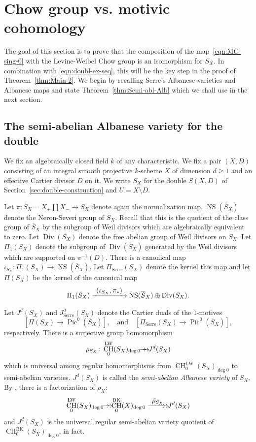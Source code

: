 \documentclass[JEP,XML,SOM,Unicode,published]{cedram}
\newcommand{\onto}{\mathchoice{\to\hspace*{-5mm}\to}{\hspace*{-.5mm}\to\hspace*{-2.85mm}\to\hspace*{-.5mm}}{\to\hspace*{-3mm}\to}{\to\hspace*{-3mm}\to}}
\def\To#1{\mathchoice{\xrightarrow{\textstyle\kern4pt#1\kern3pt}}{\stackrel{#1}{\longrightarrow}}{}{}}
\def\Onto#1{\mathchoice{\To{#1}\hspace*{-5mm}\to}{\stackrel{#1}{\onto}}{}{}}
\let\surj\onto
\newcommand{\BK}{\mathrm{BK}}
\newcommand{\LW}{\mathrm{LW}}
\newcommand{\Serre}{\mathrm{Serre}}
\theoremstyle{definition}
\newcommand{\thmref}{Theorem~\ref}
\newcommand{\secref}{Section~\ref}
\DeclareMathOperator{\CH}{CH}
\DeclareMathOperator{\Div}{Div}
\DeclareMathOperator{\NS}{NS}
\DeclareMathOperator{\Pic}{Pic}
\let\ov\overline
\let\wt\widetilde
\begin{document}
\section{Chow group vs. motivic cohomology}
\label{sec:Alb-double}
The goal of this section is to prove that the composition of the map~\eqref{eqn:MC-sing-0} with the Levine-Weibel Chow group is
an isomorphism for $S_X$.
In combination with \eqref{eqn:doubl-ex-seq}, this will be the key step
in the proof of \thmref{thm:Main-2}.
We begin by recalling Serre's Albanese varieties and Albanese
maps and state \thmref{thm:Semi-abl-Alb} which we shall use in the
next section.

\subsection{The semi-abelian Albanese variety for the double}
\label{sec:Alb-double*}
We fix an algebraically closed field $k$ of any characteristic. We fix a pair $(X,D)$ consisting of an integral smooth projective $k$-scheme $X$ of dimension $d\geq 1$ and an effective Cartier divisor $D$ on it. We write $S_X$ for the double $S(X,D)$ of
\secref{sec:double-construction} and $U=X \setminus D$.

Let $\pi: \ov{S}_X= X_+ \amalg X_- \to S_X$ denote again the normalization map.
$\NS(\ov{S}_X)$ denote the Neron-Severi group of $\ov{S}_X$. Recall that
this is the quotient of the class group of $\ov{S}_X$ by the subgroup of
Weil divisors which are algebraically equivalent to zero.
Let $\Div(S_X)$ denote the free abelian group of Weil divisors on $S_X$.
Let $\Pi_{1}(S_X)$ denote the subgroup of ${\Div}(\ov{S}_X)$ generated
by the Weil divisors which are supported on $\pi^{-1}(D)$.
There is a canonical map $\iota_{S_X} \colon \Pi_{1}(S_X) \to
\NS(\ov{S}_X)$.
Let $\Pi_{\Serre}(S_X)$ denote the kernel this map and let $\Pi(S_X)$ be the
kernel of the canonical map
\begin{equation}\label{eqn:Weil-Pic}
\Pi_{1}(S_X) \To{(\iota_{S_X}, \pi_*)} \NS(\ov{S}_X) \oplus \Div(S_X).
\end{equation}

Let $J^d(S_X)$ and $J^{d}_{\Serre}(S_X)$ denote the Cartier duals of
the $1$-motives
\[[\Pi(S_X) \to \Pic^0(\ov{S}_X)], \quad\text{and}\quad
[\Pi_{\Serre}(S_X) \to \Pic^0(\ov{S}_X)],\]
respectively.
There is a surjective group homomorphism
\[\rho_{S_X}\colon \CH_0^{\LW}(S_X)_{\deg 0} \surj J^d(S_X)\]
which is
universal among regular homomorphisms from $\CH_0^{\LW}(S_X)_{\deg 0}$
to semi-abelian varieties. $J^d(S_X)$ is called the \emph{semi-abelian Albanese
variety} of $S_X$. By \hbox{\cite[Prop.\,9.7]{BK}}, there is a factorization
of $\rho_X$:
\begin{equation}\label{eqn:alb-lci}
\CH_0^{\LW}(S_X)_{\deg 0} \surj \CH_0^{\BK}(X)_{\deg 0}
\Onto{\wt{\rho}_{S_X}} J^d(S_X)
\end{equation}
and $J^d(S_X)$ is the universal regular semi-abelian variety quotient of
$\CH_0^{\BK}(S_X)_{\deg 0}$, in fact.
\end{document}
